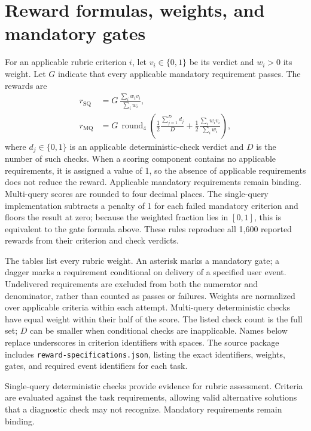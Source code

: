 \section{Reward formulas, weights, and mandatory gates}\label{app:reward-spec}
For an applicable rubric criterion $i$, let $v_i\in\{0,1\}$ be its verdict and $w_i>0$ its weight. Let $G$ indicate that every applicable mandatory requirement passes. The rewards are
\begin{align}
 r_{\mathrm{SQ}} &= G\,\frac{\sum_i w_i v_i}{\sum_i w_i},\\
 r_{\mathrm{MQ}} &= G\,\operatorname{round}_4\!\left(\frac{1}{2}\frac{\sum_{j=1}^{D}d_j}{D}+\frac{1}{2}\frac{\sum_i w_i v_i}{\sum_i w_i}\right),
\end{align}
where $d_j\in\{0,1\}$ is an applicable deterministic-check verdict and $D$ is the number of such checks. When a scoring component contains no applicable requirements, it is assigned a value of 1, so the absence of applicable requirements does not reduce the reward. Applicable mandatory requirements remain binding. Multi-query scores are rounded to four decimal places. The single-query implementation subtracts a penalty of 1 for each failed mandatory criterion and floors the result at zero; because the weighted fraction lies in $[0,1]$, this is equivalent to the gate formula above. These rules reproduce all 1,600 reported rewards from their criterion and check verdicts.

The tables list every rubric weight. An asterisk marks a mandatory gate; a dagger marks a requirement conditional on delivery of a specified user event. Undelivered requirements are excluded from both the numerator and denominator, rather than counted as passes or failures. Weights are normalized over applicable criteria within each attempt. Multi-query deterministic checks have equal weight within their half of the score. The listed check count is the full set; $D$ can be smaller when conditional checks are inapplicable. Names below replace underscores in criterion identifiers with spaces. The source package includes \texttt{reward-specifications.json}, listing the exact identifiers, weights, gates, and required event identifiers for each task.

Single-query deterministic checks provide evidence for rubric assessment. Criteria are evaluated against the task requirements, allowing valid alternative solutions that a diagnostic check may not recognize. Mandatory requirements remain binding.

